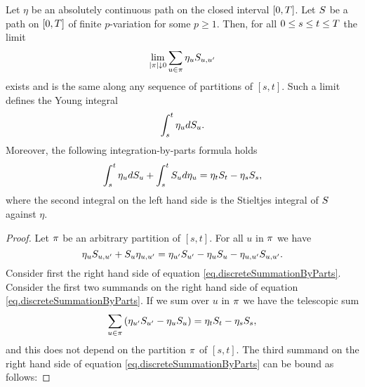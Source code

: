 \documentclass[10pt,a4paper]{article}
\begin{document}
\begin{appendices}
\begin{lemma}
\label{lemma.integrationByPartsYoungIntegral}
Let $\eta$ be an absolutely continuous path on the closed interval ${[0,T]}$. Let $S$ be a path on ${[0,T]}$ of finite $p$-variation for some $p\geq 1$. Then, for all $0\leq s \leq t \leq T$  the limit 
\begin{equation*}\label{eq.definitionOfYoungIntegral}
 \lim_{\left\lvert {\pi} \right\rvert\downarrow 0 } \sum_{u\in\pi} \eta_{u} S_{u,u^{\prime}}
\end{equation*}
exists  and is the same along any sequence of partitions of $[s,t]$. Such a limit defines the Young integral 
\begin{equation*}
\int_{s}^{t} \eta_u dS_u .
\end{equation*}
 Moreover, the following integration-by-parts formula holds 
 \begin{equation*}
 \int_{s}^{t} \eta_u dS_u  + \int_{s}^{t} S_u d\eta_u = \eta_t S_t - \eta_sS_s,  
 \end{equation*}
 where the second integral on the left hand side is the Stieltjes integral of $S$ against $\eta$. 
\end{lemma}
\begin{proof}
Let $\pi$ be an arbitrary partition of $[s,t]$. For all $u$ in $\pi$ we have 
\begin{equation}\label{eq.discreteSummationByParts}
\eta_u S_{u,u^{\prime}} + S_{u}\eta_{u,u^{\prime}}
= \eta_{u^{\prime}}S_{u^{\prime}} - \eta_{u}S_{u} - \eta_{u,u^{\prime}} S_{u,u^{\prime}}. 
\end{equation}
Consider first the right hand side of equation \eqref{eq.discreteSummationByParts}. Consider the first two summands on the right hand side of   equation \eqref{eq.discreteSummationByParts}. If we sum over $u$ in $\pi$ we have the telescopic sum 
\begin{equation*}
\sum_{u\in\pi} \left(\eta_{u^{\prime}}S_{u^{\prime}} - \eta_u S_u\right) = \eta_tS_t - \eta_s S_s,
\end{equation*}
and this does not depend on the partition $\pi$ of $[s,t]$. 
The third summand on the right hand side of   equation \eqref{eq.discreteSummationByParts} can be bound as follows:

\end{proof}
\end{appendices}
\end{document}
